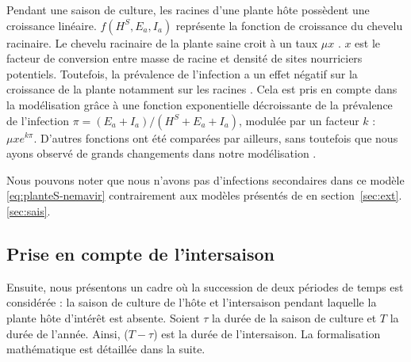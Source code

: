 	
	 Pendant une saison de culture, les racines d'une plante hôte possèdent une croissance linéaire. $f(H^S,E_a,I_a)$ représente la fonction de croissance du chevelu racinaire. Le chevelu racinaire de la plante saine croit à un taux $\mu x$  \citep{Leskovar1990}. $x$ est le facteur de conversion entre masse de racine et densité de sites nourriciers potentiels. Toutefois, la prévalence de l'infection a un effet négatif sur la croissance de la plante notamment sur les racines \citep{Ehwaeti1998}. Cela est pris en compte dans la modélisation grâce à une fonction exponentielle décroissante  de la prévalence de l'infection $\pi= (E_a+I_a)/(H^S+E_a+I_a)$, modulée par un facteur $k$ : $\mu x e^{k \pi}$.  D'autres fonctions ont été comparées par ailleurs, sans toutefois que nous ayons observé de grands changements dans notre modélisation \citep{Mercat2015}. 
	   
	Nous pouvons noter que nous n'avons pas d'infections secondaires dans ce modèle \eqref{eq:planteS-nemavir} contrairement aux modèles présentés de \citet{Mailleret2012} en section~\ref{sec:ext}.\ref{sec:sais}.
	  
	
	
\subsection{Prise en compte de l'intersaison}
	
	Ensuite, nous présentons un cadre où la succession de deux périodes de temps est considérée : la saison de culture de l'hôte et l'intersaison pendant laquelle la plante hôte d'intérêt est absente. Soient $\tau$ la durée de la saison de culture et $T$  la durée de l'année. Ainsi, ($T - \tau$) est la durée de l'intersaison.  
La formalisation mathématique est  détaillée dans la suite.
	

